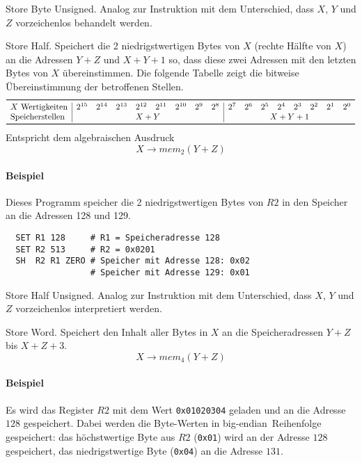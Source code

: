 \glqq Store Byte Unsigned\grqq.
Analog zur Instruktion  mit dem Unterschied, dass $X$, $Y$ und $Z$
vorzeichenlos behandelt werden.



\glqq Store Half\grqq.
Speichert die 2 niedrigstwertigen Bytes von $X$ (rechte Hälfte von $X$) an die
Adressen $Y + Z$ und $X + Y + 1$ so, dass diese zwei Adressen mit den letzten
Bytes von $X$ übereinstimmen. Die folgende Tabelle zeigt die bitweise
Übereinstimmung der betroffenen Stellen.
\[
  \begin{array}{l|*{8}{c}|*{8}{c}}
   \toprule
   X \text{ Wertigkeiten} &
   2^{15} & 2^{14} & 2^{13} & 2^{12} & 2^{11} & 2^{10} & 2^{9} & 2^{8} & 
   2^{7} & 2^{6} & 2^{5} & 2^{4} & 2^{3} & 2^{2} & 2^{1} & 2^{0}
   \\
   \text{Speicherstellen} &
   \multicolumn{8}{c|}{X + Y} &
   \multicolumn{8}{c}{X + Y + 1}
   \\\bottomrule
  \end{array}
\]
Entspricht dem algebraischen Ausdruck
\[
  X \to mem_{2} (Y + Z)
\]

\paragraph{Beispiel} Dieses Programm speicher die 2 niedrigstwertigen Bytes von
$R2$ in den Speicher an die Adressen 128 und 129.
\begin{lstlisting}
  SET R1 128     # R1 = Speicheradresse 128
  SET R2 513     # R2 = 0x0201
  SH  R2 R1 ZERO # Speicher mit Adresse 128: 0x02
                 # Speicher mit Adresse 129: 0x01
\end{lstlisting}



\glqq Store Half Unsigned\grqq.
Analog zur Instruktion  mit dem Unterschied, dass $X$, $Y$ und $Z$
vorzeichenlos interpretiert werden.


\glqq Store Word\grqq.
Speichert den Inhalt aller Bytes in $X$ an die Speicheradressen $Y + Z$ bis 
$X + Z + 3$.
\[
    X \to mem_{4}(Y + Z)
\]
\paragraph{Beispiel}
Es wird das Register $R2$ mit dem Wert \texttt{0x01020304} geladen und an die
Adresse $128$ gespeichert. Dabei werden die Byte-Werten in 
\glqq big-endian\grqq\ Reihenfolge gespeichert: das höchstwertige Byte aus $R2$
(\texttt{0x01}) wird an der Adresse $128$ gespeichert, das niedrigstwertige
Byte (\texttt{0x04}) an die Adresse $131$.

